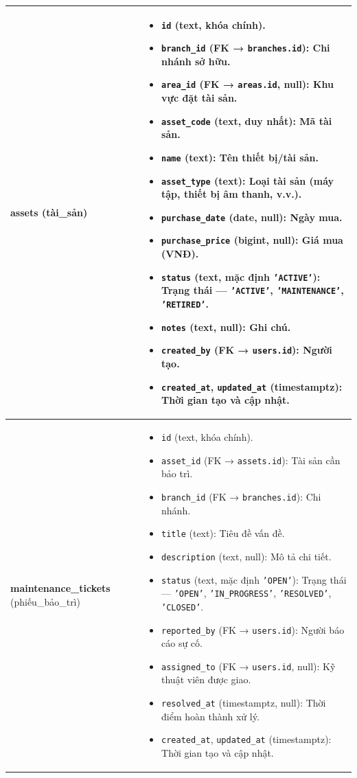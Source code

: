 \begin{longtable}{|>{\centering\arraybackslash}m{4.5cm}|>{\raggedright\arraybackslash}m{11.5cm}|}
\textbf{assets} \newline (tài\_sản) &
\begin{itemize}
    \item \texttt{id} (text, khóa chính).
    \item \texttt{branch\_id} (FK → \texttt{branches.id}): Chi nhánh sở hữu.
    \item \texttt{area\_id} (FK → \texttt{areas.id}, null): Khu vực đặt tài sản.
    \item \texttt{asset\_code} (text, duy nhất): Mã tài sản.
    \item \texttt{name} (text): Tên thiết bị/tài sản.
    \item \texttt{asset\_type} (text): Loại tài sản (máy tập, thiết bị âm thanh, v.v.).
    \item \texttt{purchase\_date} (date, null): Ngày mua.
    \item \texttt{purchase\_price} (bigint, null): Giá mua (VNĐ).
    \item \texttt{status} (text, mặc định \texttt{'ACTIVE'}): Trạng thái — \texttt{'ACTIVE'}, \texttt{'MAINTENANCE'}, \texttt{'RETIRED'}.
    \item \texttt{notes} (text, null): Ghi chú.
    \item \texttt{created\_by} (FK → \texttt{users.id}): Người tạo.
    \item \texttt{created\_at}, \texttt{updated\_at} (timestamptz): Thời gian tạo và cập nhật.
\end{itemize} \\ \hline

\textbf{maintenance\_tickets} \newline (phiếu\_bảo\_trì) &
\begin{itemize}
    \item \texttt{id} (text, khóa chính).
    \item \texttt{asset\_id} (FK → \texttt{assets.id}): Tài sản cần bảo trì.
    \item \texttt{branch\_id} (FK → \texttt{branches.id}): Chi nhánh.
    \item \texttt{title} (text): Tiêu đề vấn đề.
    \item \texttt{description} (text, null): Mô tả chi tiết.
    \item \texttt{status} (text, mặc định \texttt{'OPEN'}): Trạng thái — \texttt{'OPEN'}, \texttt{'IN\_PROGRESS'}, \texttt{'RESOLVED'}, \texttt{'CLOSED'}.
    \item \texttt{reported\_by} (FK → \texttt{users.id}): Người báo cáo sự cố.
    \item \texttt{assigned\_to} (FK → \texttt{users.id}, null): Kỹ thuật viên được giao.
    \item \texttt{resolved\_at} (timestamptz, null): Thời điểm hoàn thành xử lý.
    \item \texttt{created\_at}, \texttt{updated\_at} (timestamptz): Thời gian tạo và cập nhật.
\end{itemize} \\ \hline


\end{longtable}
